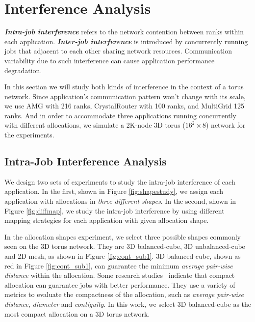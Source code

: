\section{Interference Analysis}
\label{sec:interference}

\textbf{\emph{Intra-job interference}} refers to the network 
contention between ranks within each application. 
\textbf{\emph{Inter-job interference}} is introduced by concurrently 
running jobs that adjacent to each other sharing network resources. 
Communication variability due to such interference can 
cause application performance degradation.

In this section we will study both kinds of interference 
in the context of a torus network. 
Since application's communication pattern won't change with its scale, 
we use AMG with 216 ranks, CrystalRouter with 100 ranks, and MultiGrid 125 ranks. 
And in order to accommodate three applications running concurrently with different allocations, 
we simulate a 2K-node 3D torus ($16^{2} \times 8$) network for the experiments.


\subsection{Intra-Job Interference Analysis}
\label{sec: introjob}

We design two sets of experiments to study the 
intra-job interference of each application. 
In the first, shown in Figure \ref{fig:shapestudy}, 
we assign each application with allocations in \emph{three different shapes}. 
In the second, shown in Figure \ref{fig:diffmap}, 
we study the intra-job interference by using different 
mapping strategies for each application with given allocation shape. 

In the allocation shapes experiment, 
we select three possible shapes commonly seen on the 3D torus network. 
They are 3D balanced-cube, 3D unbalanced-cube and 2D mesh, 
as shown in Figure \ref{fig:cont_sub1}.
3D balanced-cube, shown as red in Figure \ref{fig:cont_sub1}, 
can guarantee the minimum \emph{average pair-wise distance} within the allocation. 
Some research studies~\cite{leung,abhinav-sc13} indicate that 
compact allocation can guarantee jobs with better performance. 
They use a variety of metrics to evaluate the compactness of the allocation, 
such as \emph{average pair-wise distance}, \emph{diameter} and \emph{contiguity}. 
In this work, we select 3D balanced-cube as the most compact allocation on a 3D torus network.

